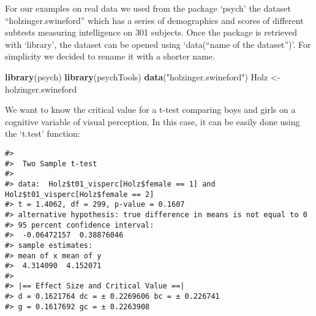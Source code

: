 \documentclass[
  man]{apa7}
\newenvironment{Shaded}{\begin{snugshade}}{\end{snugshade}}
\newcommand{\AttributeTok}[1]{\textcolor[rgb]{0.13,0.29,0.53}{#1}}
\newcommand{\DecValTok}[1]{\textcolor[rgb]{0.00,0.00,0.81}{#1}}
\newcommand{\FunctionTok}[1]{\textcolor[rgb]{0.13,0.29,0.53}{\textbf{#1}}}
\newcommand{\NormalTok}[1]{#1}
\newcommand{\OtherTok}[1]{\textcolor[rgb]{0.56,0.35,0.01}{#1}}
\newcommand{\SpecialCharTok}[1]{\textcolor[rgb]{0.81,0.36,0.00}{\textbf{#1}}}
\newcommand{\StringTok}[1]{\textcolor[rgb]{0.31,0.60,0.02}{#1}}
\begin{document}
\normalsize

For our examples on real data we used from the package `psych' the dataset ``holzinger.swineford'' which has a series of demographics and scores of different subtests measuring intelligence on 301 subjects. Once the package is retrieved with `library', the dataset can be opened using `data(``name of the dataset'')'. For simplicity we decided to rename it with a shorter name.

\footnotesize

\begin{Shaded}
\begin{Highlighting}[]
\FunctionTok{library}\NormalTok{(psych)}
\FunctionTok{library}\NormalTok{(psychTools)}
\FunctionTok{data}\NormalTok{(}\StringTok{"holzinger.swineford"}\NormalTok{)}
\NormalTok{Holz }\OtherTok{\textless{}{-}}\NormalTok{ holzinger.swineford}
\end{Highlighting}
\end{Shaded}

\normalsize

We want to know the critical value for a t-test comparing boys and girls on a cognitive variable of visual perception. In this case, it can be easily done using the `t.test' function:

\footnotesize

\begin{Shaded}
\end{Shaded}

\begin{verbatim}
#> 
#>  Two Sample t-test
#> 
#> data:  Holz$t01_visperc[Holz$female == 1] and Holz$t01_visperc[Holz$female == 2]
#> t = 1.4062, df = 299, p-value = 0.1607
#> alternative hypothesis: true difference in means is not equal to 0
#> 95 percent confidence interval:
#>  -0.06472157  0.38876046
#> sample estimates:
#> mean of x mean of y 
#>  4.314090  4.152071 
#> 
#> |== Effect Size and Critical Value ==| 
#> d = 0.1621764 dc = ± 0.2269606 bc = ± 0.226741 
#> g = 0.1617692 gc = ± 0.2263908
\end{verbatim}
\end{document}
